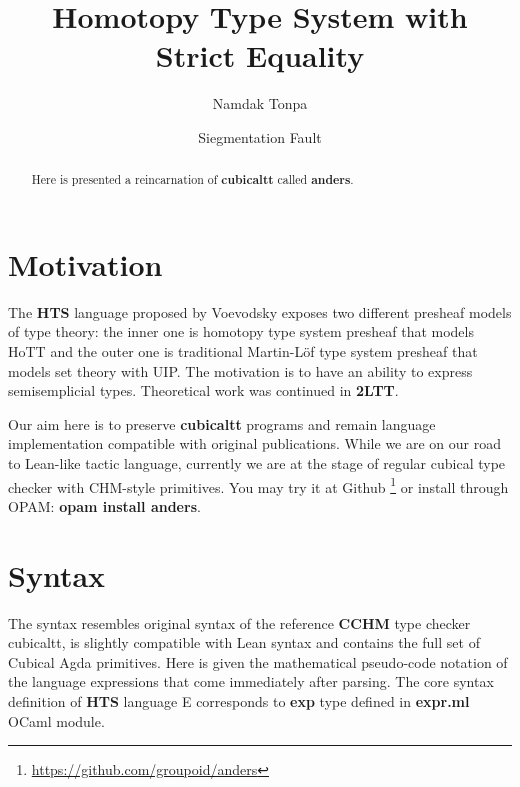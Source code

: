 \documentclass[a4paper,UKenglish,cleveref, autoref, thm-restate]{lipics-v2021}
\title{Homotopy Type System with Strict Equality}
\author{Namdak Tonpa}{Groupoid Infinity}{maxim@synrc.com}{https://orcid.org/0000-0001-7127-8796}{}
\author{Siegmentation Fault}{Groupoid Infinity}{siegmentationfault@yandex.ru}{}{}
\begin{document}
\maketitle

\begin{abstract}
Here is presented a reincarnation of \textbf{cubicaltt} called \textbf{anders}.
\end{abstract}

\section{Motivation}
\label{sec:typesetting-summary}

The \textbf{HTS}\cite{Voevodsky13} language proposed by Voevodsky exposes two different
presheaf models of type theory: the inner one is homotopy type system presheaf that
models HoTT and the outer one is traditional Martin-Löf type system presheaf that
models set theory with UIP. The motivation is to have an ability to express
semisemplicial types. Theoretical work was continued in \textbf{2LTT}\cite{Annenkov19}.

Our aim here is to preserve \textbf{cubicaltt} programs and remain language implementation compatible with original publications.
While we are on our road to Lean-like tactic language, currently we are at the stage of regular cubical type
checker with CHM-style primitives. You may try it at Github \footnote{\url{https://github.com/groupoid/anders}}
or install through OPAM: \textbf{opam install anders}.

\section{Syntax}

The syntax resembles original syntax of the reference \textbf{CCHM} type checker cubicaltt,
is slightly compatible with Lean syntax and contains the full set of Cubical
Agda\cite{Vezzosi19} primitives. Here is given the mathematical pseudo-code
notation of the language expressions that come immediately after parsing.
The core syntax definition of \textbf{HTS} language E corresponds to \textbf{exp} type
defined in \textbf{expr.ml} OCaml module.
\end{document}
